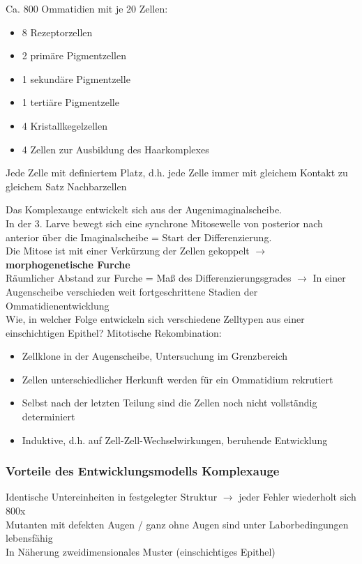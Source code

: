 Ca. 800 Ommatidien mit je 20 Zellen:
\begin{itemize}
	\item 8 Rezeptorzellen
	\item 2 primäre Pigmentzellen
	\item 1 sekundäre Pigmentzelle
	\item 1 tertiäre Pigmentzelle
	\item 4 Kristallkegelzellen
	\item 4 Zellen zur Ausbildung des Haarkomplexes
\end{itemize}

Jede Zelle mit definiertem Platz, d.h. jede Zelle immer mit gleichem Kontakt zu gleichem Satz Nachbarzellen

Das Komplexauge entwickelt sich aus der Augenimaginalscheibe.\\
In der 3. Larve bewegt sich eine synchrone Mitosewelle von posterior nach anterior über die Imaginalscheibe = Start der Differenzierung.\\
Die Mitose ist mit einer Verkürzung der Zellen gekoppelt $\rightarrow$ \textbf{morphogenetische Furche}\\
Räumlicher Abstand zur Furche = Maß des Differenzierungsgrades $\rightarrow$ In einer Augenscheibe verschieden weit fortgeschrittene Stadien der Ommatidienentwicklung\\

Wie, in welcher Folge entwickeln sich verschiedene Zelltypen aus einer einschichtigen Epithel? Mitotische Rekombination:
\begin{itemize}
	\item Zellklone in der Augenscheibe, Untersuchung im Grenzbereich
	\item Zellen unterschiedlicher Herkunft werden für ein Ommatidium rekrutiert
	\item Selbst nach der letzten Teilung sind die Zellen noch nicht vollständig determiniert
	\item Induktive, d.h. auf Zell-Zell-Wechselwirkungen, beruhende Entwicklung
\end{itemize}

\subsubsection{Vorteile des Entwicklungsmodells Komplexauge}
Identische Untereinheiten in festgelegter Struktur $\rightarrow$ jeder Fehler wiederholt sich 800x\\
Mutanten mit defekten Augen / ganz ohne Augen sind unter Laborbedingungen lebensfähig\\
In Näherung zweidimensionales Muster (einschichtiges Epithel)